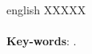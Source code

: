 \begin{resumo}[Abstract]
	\begin{otherlanguage*}{english}
        XXXXX
\\\\
		\textbf{Key-words}: \KeyWordA.~
	\end{otherlanguage*}
\end{resumo}

